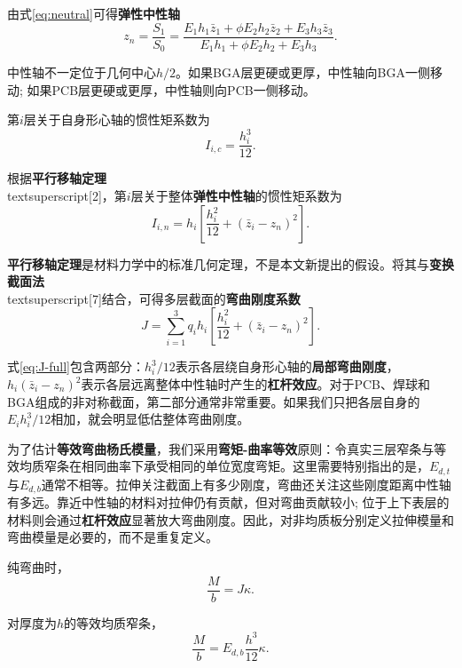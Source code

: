 \documentclass[draft,12pt,a4paper]{ctexart}
\theoremstyle{definition}
\begin{document}
由式\eqref{eq:neutral}可得\textbf{弹性中性轴}
\begin{equation}\label{eq:zn}
z_n=\frac{S_1}{S_0}
=\frac{E_1 h_1\bar{z}_1+\phi E_2 h_2\bar{z}_2+E_3 h_3\bar{z}_3}
{E_1 h_1+\phi E_2 h_2+E_3 h_3}.
\end{equation}

中性轴不一定位于几何中心$h/2$。如果BGA层更硬或更厚，中性轴向BGA一侧移动; 如果PCB层更硬或更厚，中性轴则向PCB一侧移动。

第$i$层关于自身形心轴的惯性矩系数为
\begin{equation}
I_{i,c}=\frac{h_i^3}{12}.
\end{equation}

根据\textbf{平行移轴定理}\\textsuperscript{[2]}，第$i$层关于整体\textbf{弹性中性轴}的惯性矩系数为
\begin{equation}\label{eq:Iin}
I_{i,n}=h_i\left[\frac{h_i^2}{12}+(\bar{z}_i-z_n)^2\right].
\end{equation}

\textbf{平行移轴定理}是材料力学中的标准几何定理，不是本文新提出的假设。将其与\textbf{变换截面法}\\textsuperscript{[7]}结合，可得多层截面的\textbf{弯曲刚度系数}
\begin{equation}\label{eq:J-full}
J=\sum_{i=1}^{3}q_i h_i
\left[\frac{h_i^2}{12}+(\bar{z}_i-z_n)^2\right].
\end{equation}

式\eqref{eq:J-full}包含两部分：$h_i^3/12$表示各层绕自身形心轴的\textbf{局部弯曲刚度}，$h_i(\bar{z}_i-z_n)^2$表示各层远离整体中性轴时产生的\textbf{杠杆效应}。对于PCB、焊球和BGA组成的非对称截面，第二部分通常非常重要。如果我们只把各层自身的$E_i h_i^3/12$相加，就会明显低估整体弯曲刚度。

为了估计\textbf{等效弯曲杨氏模量}，我们采用\textbf{弯矩-曲率等效}原则：令真实三层窄条与等效均质窄条在相同曲率下承受相同的单位宽度弯矩。这里需要特别指出的是，$E_{d,t}$与$E_{d,b}$通常不相等。拉伸关注截面上有多少刚度，弯曲还关注这些刚度距离中性轴有多远。靠近中性轴的材料对拉伸仍有贡献，但对弯曲贡献较小; 位于上下表层的材料则会通过\textbf{杠杆效应}显著放大弯曲刚度。因此，对非均质板分别定义拉伸模量和弯曲模量是必要的，而不是重复定义。

纯弯曲时，
\begin{equation}
\frac{M}{b}=J\kappa.
\end{equation}

对厚度为$h$的等效均质窄条，
\begin{equation}
\frac{M}{b}=E_{d,b}\frac{h^3}{12}\kappa.
\end{equation}
\end{document}
